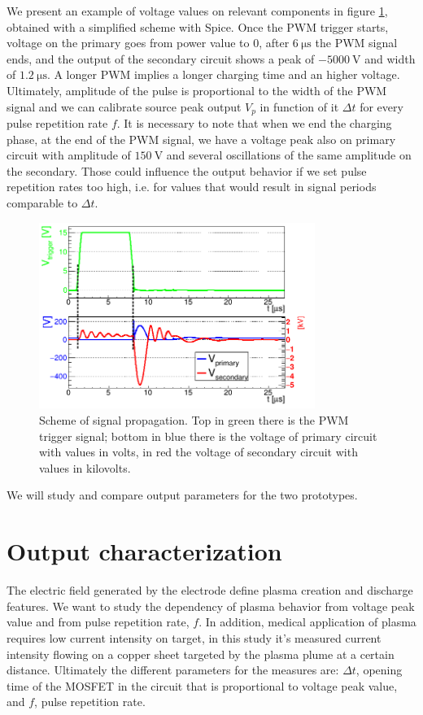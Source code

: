 We present an example of voltage values on relevant components in figure \ref{fig:signals}, obtained with a simplified scheme with Spice. Once the PWM trigger starts, voltage on the primary goes from power value to $0$, after $\SI{6}{\micro\second}$ the PWM signal ends, and the output of the secondary circuit shows a peak of $\SI{-5000}{\volt}$ and width of $\SI{1.2}{\micro\second}$. A longer PWM implies a longer charging time and an higher voltage. Ultimately, amplitude of the pulse is proportional to the width of the PWM signal and we can calibrate source peak output $V_p$ in function of it $\Delta t$ for every pulse repetition rate $f$.
It is necessary to note that when we end the charging phase, at the end of the PWM signal, we have a voltage peak also on primary circuit with amplitude of $\SI{150}{\volt}$ and several oscillations of the same amplitude on the secondary. Those could influence the output behavior if we set pulse repetition rates too high, i.e. for values that would result in signal periods comparable to $\Delta t$.
\begin{figure}
 \centering
 \includegraphics[width=0.8\textwidth]{Images/Electric/segnaliB2.png}
 \caption{Scheme of signal propagation. Top in green there is the PWM trigger signal; bottom in blue there is the voltage of primary circuit with values in volts, in red the voltage of secondary circuit with values in kilovolts.}
 \label{fig:signals}
\end{figure}

We will study and compare output parameters for the two prototypes.

\section{Output characterization}
The electric field generated by the electrode define plasma creation and discharge features. We want to study the dependency of plasma behavior from voltage peak value and from pulse repetition rate, $f$. In addition, medical application of plasma requires low current intensity on target, in this study it's measured current intensity flowing on a copper sheet targeted by the plasma plume at a certain distance. Ultimately the different parameters for the measures are: $\Delta t$, opening time of the MOSFET in the circuit that is proportional to voltage peak value, and $f$, pulse repetition rate. 

